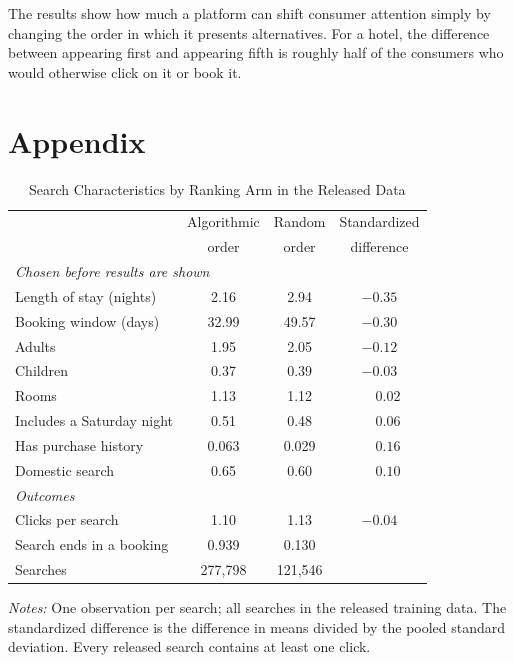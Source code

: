 \documentclass[12pt]{article}
\begin{document}
The results show how much a platform can shift consumer attention simply by changing the order in which it presents alternatives. For a hotel, the difference between appearing first and appearing fifth is roughly half of the consumers who would otherwise click on it or book it.




\clearpage
\appendix
\setcounter{table}{0}
\renewcommand{\thetable}{A\arabic{table}}
\section*{Appendix}

\begin{table}[htbp]
\centering
\begin{threeparttable}
\caption{Search Characteristics by Ranking Arm in the Released Data}
\label{tab:sampling}
\begin{tabular}{lccc}
\toprule
 & Algorithmic & Random & Standardized \\
 & order & order & difference \\
\midrule
\multicolumn{4}{l}{\textit{Chosen before results are shown}} \\
\quad Length of stay (nights) & 2.16 & 2.94 & $-0.35$ \\
\quad Booking window (days) & 32.99 & 49.57 & $-0.30$ \\
\quad Adults & 1.95 & 2.05 & $-0.12$ \\
\quad Children & 0.37 & 0.39 & $-0.03$ \\
\quad Rooms & 1.13 & 1.12 & $\phantom{-}0.02$ \\
\quad Includes a Saturday night & 0.51 & 0.48 & $\phantom{-}0.06$ \\
\quad Has purchase history & 0.063 & 0.029 & $\phantom{-}0.16$ \\
\quad Domestic search & 0.65 & 0.60 & $\phantom{-}0.10$ \\[0.3em]
\multicolumn{4}{l}{\textit{Outcomes}} \\
\quad Clicks per search & 1.10 & 1.13 & $-0.04$ \\
\quad Search ends in a booking & 0.939 & 0.130 & \\[0.3em]
Searches & 277,798 & 121,546 & \\
\bottomrule
\end{tabular}
\begin{tablenotes}\footnotesize
\item \textit{Notes:} One observation per search; all searches in the released training data. The standardized difference is the difference in means divided by the pooled standard deviation. Every released search contains at least one click.
\end{tablenotes}
\end{threeparttable}
\end{table}
\end{document}
